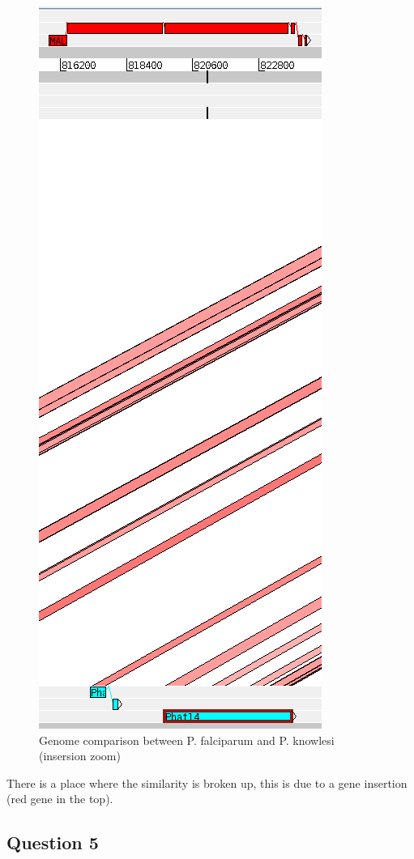 \documentclass[]{article}
\theoremstyle{definition}
\begin{document}
 \begin{figure}[H]
	\centering
	\includegraphics*[scale=0.3]{image/q4.png}
	\caption{ Genome comparison between P. falciparum and P. knowlesi (insersion zoom) }
\end{figure}
There is a place where the similarity is broken up, this is due to a gene insertion (red gene in the top).

\subsection{Question 5}
\end{document}
